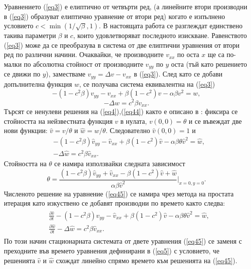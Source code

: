 \documentclass{article}
\newcommand{\rf}[1]{(\ref{#1})}
\begin{document}
Уравнението \rf{eq3} е елиптично от четвърти ред, (а линейните втори производни в \rf{eq3} образуват елиптично уравнение от втори ред) когато е изпълнено условието $c < \min (1/ \sqrt{\beta},1)$. В настоящата работа се разглеждат единствено такива параметри $\beta$ и $c$, които удовлетворяват последното изискване.
Равенството \rf{eq3} може да се преобразува в система от две елиптични уравнения от втори ред по различни начини. Очаквайки, че производните $v_{xx}$ по оста $x$ ще са по-малки по абсолютна стойност от производните $v_{yy}$ по $y$ оста (тъй като решението се движи по $y$), заместваме $v_{yy} = \Delta v- v_{xx}$ в \rf{eq3}. След като се добави допълнителна функция $w$, се получава система еквивалентна на \rf{eq3}
\begin{equation}\label{eq4}
- (1- c^2 \beta) v_{yy} - v_{xx} + \beta (1-c^2) v - \alpha \beta v^2 = w, 
\end{equation}
\begin{equation}\label{eq44}
 - \Delta w = c^2 \beta v_{xx}. 
\end{equation}
Търсят се ненулеви решения на \rf{eq4},\rf{eq44} както е описано в \cite{ref116, ref117}: фиксира се стойността на нейзвестната функция $v$ в нулата, $v(0,0)=\theta$ и се въвеждат две нови функции: $\widehat{v}=v/{\theta} $ и $\widehat{w}=w/{\theta} $. Следователно $\widehat{v}(0,0)=1$ и 
\begin{equation}\label{eq45}
\begin{split}
 &- (1 - c^2 \beta) \widehat{v}_{yy} -\widehat{v}_{xx} + \beta (1-c^2) \widehat{v} - \alpha \beta \theta \widehat{v}^2 = \widehat{w}, \\
 &- \Delta \widehat{w} =  c^2 \beta \widehat{v}_{xx}.
\end{split}
\end{equation}
Стойността на $\theta$ се намира използвайки следната зависимост
\begin{equation}\label{eqtheta}
\theta = \frac{ (1-c^2 \beta) \widehat{v}_{yy} + \widehat{v}_{xx} - \beta (1-c^2) \widehat{v} +\widehat{w}}{\alpha \beta \widehat{v}^2 } |_{x=0,y=0}.
\end{equation}
Численото решение на уравнение \rf{eq45} се намира чрез метода на простата итерация като изкуствено се добавят производни по времето както следва:
\begin{align}\label{eq5}
\begin{split}
 &\frac {\partial \widehat{v}}{\partial t} - (1 - c^2 \beta) \widehat{v}_{yy} -\widehat{v}_{xx} + \beta (1-c^2) \widehat{v} - \alpha \beta \theta \widehat{v}^2 = \widehat{w}, \\
 &\frac {\partial \widehat{w}}{\partial t} - \Delta \widehat{w} =  c^2 \beta \widehat{v}_{xx}. 
\end{split}
\end{align}
По този начин стационарната системата от двете уравнения \rf{eq45} се заменя с преходните във времето уравнения дефинирани в \rf{eq5} с условието, че решенията $\widehat{v}$ и $\widehat{w}$ схождат линейно спрямо времето към решенията на \rf{eq45}.
\end{document}
